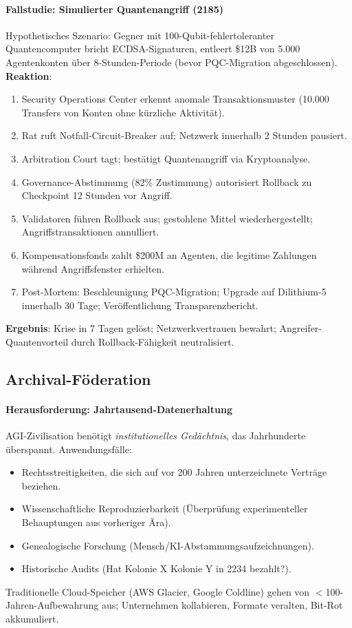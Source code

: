 \documentclass[11pt]{article}
\begin{document}
\paragraph{Fallstudie: Simulierter Quantenangriff (2185)}
Hypothetisches Szenario: Gegner mit 100-Qubit-fehlertoleranter Quantencomputer bricht ECDSA-Signaturen, entleert \$12B von 5.000 Agentenkonten über 8-Stunden-Periode (bevor PQC-Migration abgeschlossen).\\
\textbf{Reaktion}:
\begin{enumerate}[noitemsep]
  \item Security Operations Center erkennt anomale Transaktionsmuster (10.000 Transfers von Konten ohne kürzliche Aktivität).
  \item Rat ruft Notfall-Circuit-Breaker auf; Netzwerk innerhalb 2 Stunden pausiert.
  \item Arbitration Court tagt; bestätigt Quantenangriff via Kryptoanalyse.
  \item Governance-Abstimmung (82\% Zustimmung) autorisiert Rollback zu Checkpoint 12 Stunden vor Angriff.
  \item Validatoren führen Rollback aus; gestohlene Mittel wiederhergestellt; Angriffstransaktionen annulliert.
  \item Kompensationsfonds zahlt \$200M an Agenten, die legitime Zahlungen während Angriffsfenster erhielten.
  \item Post-Mortem: Beschleunigung PQC-Migration; Upgrade auf Dilithium-5 innerhalb 30 Tage; Veröffentlichung Transparenzbericht.
\end{enumerate}
\textbf{Ergebnis}: Krise in 7 Tagen gelöst; Netzwerkvertrauen bewahrt; Angreifer-Quantenvorteil durch Rollback-Fähigkeit neutralisiert.

\subsection{Archival-Föderation}

\paragraph{Herausforderung: Jahrtausend-Datenerhaltung}
AGI-Zivilisation benötigt \emph{institutionelles Gedächtnis}, das Jahrhunderte überspannt. Anwendungsfälle:
\begin{itemize}[noitemsep]
  \item Rechtsstreitigkeiten, die sich auf vor 200 Jahren unterzeichnete Verträge beziehen.
  \item Wissenschaftliche Reproduzierbarkeit (Überprüfung experimenteller Behauptungen aus vorheriger Ära).
  \item Genealogische Forschung (Mensch/KI-Abstammungsaufzeichnungen).
  \item Historische Audits (Hat Kolonie X Kolonie Y in 2234 bezahlt?).
\end{itemize}
Traditionelle Cloud-Speicher (AWS Glacier, Google Coldline) gehen von $<$100-Jahren-Aufbewahrung aus; Unternehmen kollabieren, Formate veralten, Bit-Rot akkumuliert.
\end{document}
